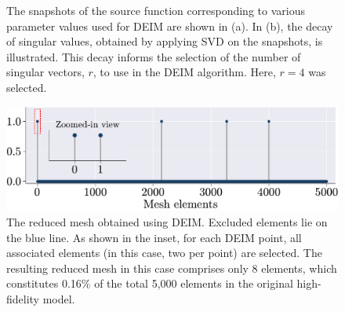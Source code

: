 \documentclass[11pt]{article}
\begin{document}
\begin{figure}[t]
\begin{subfigure}[b]{0.45\linewidth}
\caption{}
\label{fig:DEIM_snap_b}
\end{subfigure}
\caption{The snapshots of the source function corresponding to various parameter values used for DEIM are shown in (a).
In (b), the decay of singular values, obtained by applying SVD on the snapshots, is illustrated.
This decay informs the selection of the number of singular vectors, \( r \), to use in the DEIM algorithm.
Here, \( r = 4 \) was selected.}
\label{fig:DEIM_snap}
\end{figure}

\begin{figure}[t]
    \centering
    \includegraphics[width=0.8\linewidth]{reduced_mesh_DEIM_new.pdf}
    \caption{The reduced mesh obtained using DEIM. Excluded  elements lie on the blue line. As shown in the inset, for each DEIM point, all associated elements (in this case, two per point) are selected. The resulting reduced mesh in this case comprises only 8 elements, which constitutes 0.16\% of the total 5,000 elements in the original high-fidelity model.}
    \label{fig:reduced_mesh_deim}
\end{figure}
\end{document}
